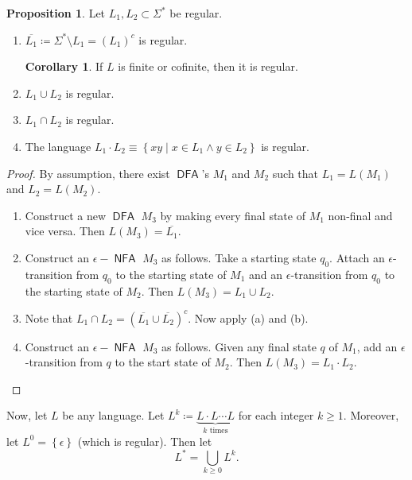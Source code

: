 \documentclass[10pt,letterpaper,cm]{nupset}
\theoremstyle{definition}
\theoremstyle{theorem}
\newtheorem{prop}[definition]{Proposition}
\newtheorem{corollary}[definition]{Corollary}
\theoremstyle{remark}
\newcommand{\1}{\mathbf{1}}
\newcommand{\0}{\vec 0}
\DeclareMathOperator{\DFA}{\mathsf{DFA}}
\DeclareMathOperator{\NFA}{\mathsf{NFA}}
\begin{document}
\begin{prop} Let $L_1, L_2\subset \Sigma^{\ast}$ be regular. 
\begin{enumerate}[label=(\alph*)]
\item $\overline{L_1}\coloneqq \Sigma^{\ast} \setminus L_1 = \left(L_1\right)^c$ is regular.
\begin{corollary}
If $L$ is finite or cofinite, then it is regular.
\end{corollary}
\item $L_1 \cup L_2$ is regular.
\item $L_1 \cap L_2$ is regular. 
\item The language $L_1\cdot L_2 \equiv  \left\{xy \mid x\in L_1 \land y\in L_2\right\}$ is regular. 
\end{enumerate}
\end{prop} 
\begin{proof} By assumption, there exist $\DFA$'s $M_1$ and $M_2$ such that $L_1 = L(M_1)$ and $L_2 = L(M_2)$.
\begin{enumerate}[label=(\alph*)]
\item Construct a new $\DFA$ $M_3$ by making every final state of $M_1$ non-final and vice versa. Then $L(M_3) = \overline{L_1}$.
\item Construct an $\epsilon{-}\NFA$ $M_3$ as follows. Take a starting state $q_0$. Attach  an $\epsilon$-transition  from $q_0$ to the starting state of $M_1$  and  an $\epsilon$-transition from $q_0$ to the starting state of $M_2$. Then $L(M_3) = L_1 \cup L_2$.
\item Note that $L_1 \cap L_2 = \left(\overline{L_1} \cup \overline{L_2}\right)^c$.  Now apply (a) and (b).
\item Construct an $\epsilon{-}\NFA$ $M_3$ as follows. Given any final state $q$ of $M_1$, add an $\epsilon$-transition from $q$ to the start state of $M_2$. Then $L(M_3) = L_1\cdot L_2$.
\end{enumerate}
\end{proof}

\medskip

Now, let $L$ be any language. Let $L^k \coloneqq \underbrace{L\cdot L \cdots L}_{k \text{ times}}$ for each integer $k\geq 1$. Moreover, let $L^0 = \left\{\epsilon\right\}$ (which is regular). Then let $$L^{\ast} = \bigcup_{k\geq 0} L^k.$$

\medskip
\end{document}

